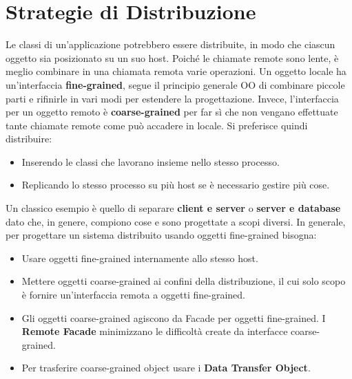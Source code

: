 \section{Strategie di Distribuzione}
Le classi di un’applicazione potrebbero essere distribuite, in modo che ciascun oggetto sia posizionato su un suo host. Poiché le chiamate remote sono lente, è meglio combinare in una chiamata remota varie operazioni. Un oggetto locale ha un’interfaccia \textbf{fine-grained}, segue il principio generale OO di combinare piccole parti e rifinirle in vari modi per estendere la progettazione. Invece, l’interfaccia per un oggetto remoto è \textbf{coarse-grained} per far sì che non vengano effettuate tante chiamate remote come può accadere in locale.
Si preferisce quindi distribuire:
\begin{itemize}
    \item Inserendo le classi che lavorano insieme nello stesso processo.
    \item Replicando lo stesso processo su più host se è necessario gestire più cose.
\end{itemize}
Un classico esempio è quello di separare \textbf{client e server} o \textbf{server e database} dato che, in genere, compiono cose e sono progettate a scopi diversi. In generale, per progettare un sistema distribuito usando oggetti fine-grained bisogna:
\begin{itemize}
    \item Usare oggetti fine-grained internamente allo stesso host.
    \item Mettere oggetti coarse-grained ai confini della distribuzione, il cui solo scopo è fornire un’interfaccia remota a oggetti fine-grained.
    \item Gli oggetti coarse-grained agiscono da Facade per oggetti fine-grained. I \textbf{Remote Facade} minimizzano le difficoltà create da interfacce coarse-grained.
    \item Per trasferire coarse-grained object usare i \textbf{Data Transfer Object}.
\end{itemize}

